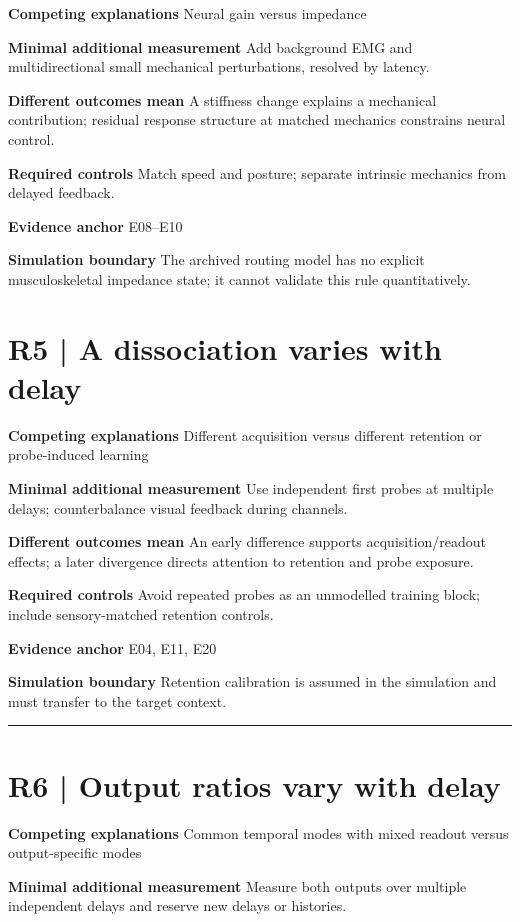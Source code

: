 \documentclass[11pt,a4paper]{article}
\begin{document}
\medskip\textbf{Competing explanations} Neural gain versus impedance\par
\medskip\textbf{Minimal additional measurement} Add background EMG and multidirectional small mechanical perturbations, resolved by latency.\par
\medskip\textbf{Different outcomes mean} A stiffness change explains a mechanical contribution; residual response structure at matched mechanics constrains neural control.\par
\medskip\textbf{Required controls} Match speed and posture; separate intrinsic mechanics from delayed feedback.\par
\medskip\textbf{Evidence anchor} E08--E10\par
\medskip\textbf{Simulation boundary} The archived routing model has no explicit musculoskeletal impedance state; it cannot validate this rule quantitatively.\par
\clearpage\section{R5 | A dissociation varies with delay}
\medskip\textbf{Competing explanations} Different acquisition versus different retention or probe-induced learning\par
\medskip\textbf{Minimal additional measurement} Use independent first probes at multiple delays; counterbalance visual feedback during channels.\par
\medskip\textbf{Different outcomes mean} An early difference supports acquisition/readout effects; a later divergence directs attention to retention and probe exposure.\par
\medskip\textbf{Required controls} Avoid repeated probes as an unmodelled training block; include sensory-matched retention controls.\par
\medskip\textbf{Evidence anchor} E04, E11, E20\par
\medskip\textbf{Simulation boundary} Retention calibration is assumed in the simulation and must transfer to the target context.\par
\bigskip\hrule\medskip\section{R6 | Output ratios vary with delay}
\medskip\textbf{Competing explanations} Common temporal modes with mixed readout versus output-specific modes\par
\medskip\textbf{Minimal additional measurement} Measure both outputs over multiple independent delays and reserve new delays or histories.\par
\end{document}
